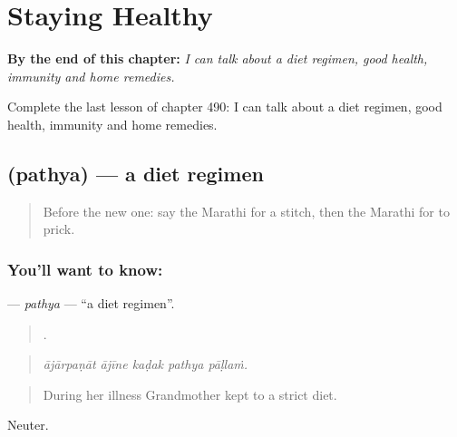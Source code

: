 
\chapter{Staying Healthy}
\label{ch:mr-staying-healthy}

\begin{chapteropening}
\textbf{By the end of this chapter:} \emph{I can talk about a diet regimen, good health, immunity and home remedies.}

Complete the last lesson of chapter 490: I can talk about a diet regimen, good health, immunity and home remedies.
\end{chapteropening}

\section[\texorpdfstring{\mr{पथ्य} (pathya)}{पथ्य (pathya)}]{ (pathya) — a diet regimen}

\label{lesson:MR-C490-pathya}



\begin{quote}
Before the new one: say the Marathi for a stitch, then the Marathi for to prick.
\end{quote}

\subsection*{You'll want to know: }
\textbf{} — \emph{pathya} — \textquotedblleft{}a diet regimen\textquotedblright{}.

\begin{quote}
    .
\end{quote}

\begin{quote}
\emph{ājārpaṇāt ājīne kaḍak pathya pāḷlaṁ.}
\end{quote}

\begin{quote}
During her illness Grandmother kept to a strict diet.
\end{quote}

Neuter.

